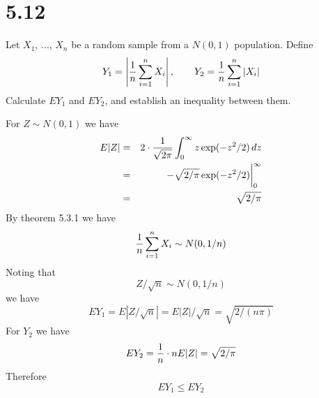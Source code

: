 \section*{5.12}
Let $X_1$, $\ldots$, $X_n$ be a random sample from a $N(0,1)$
population. Define
$$Y_1=\left|{1\over n}\sum_{i=1}^n X_i\right|,\qquad
Y_2={1\over n}\sum_{i=1}^n|X_i|$$
Calculate $EY_1$ and $EY_2$, and establish an inequality between
them.

\bigskip
\noindent
For $Z\sim N(0,1)$ we have
\begin{eqnarray*}
E|Z|&=&2\cdot{1\over\sqrt{2\pi}}\int_0^\infty z\exp(-z^2/2)\,dz\\
&=&-\sqrt{2/\pi}\exp(-z^2/2)\bigg|_0^\infty\\
&=&\sqrt{2/\pi}
\end{eqnarray*}
By theorem 5.3.1 we have
$${1\over n}\sum_{i=1}^nX_i\sim N(0,1/n)$$
Noting that
$$Z/\sqrt n\sim N(0,1/n)$$
we have
$$EY_1=E|Z/\sqrt n|=E|Z|/\sqrt n=\sqrt{2/(n\pi)}$$
For $Y_2$ we have
$$EY_2={1\over n}\cdot nE|Z|=\sqrt{2/\pi}$$
Therefore
$$EY_1\le EY_2$$

